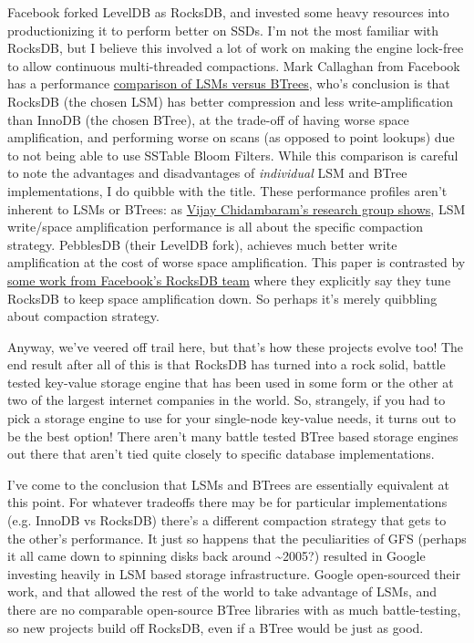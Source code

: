 \documentclass[a4paper,12pt,notitlepage,twoside,openright]{article}
\begin{document}
Facebook forked LevelDB as RocksDB, and invested some heavy resources
into productionizing it to perform better on SSDs. I'm not the most
familiar with RocksDB, but I believe this involved a lot of work on
making the engine lock-free to allow continuous multi-threaded
compactions. Mark Callaghan from Facebook has a performance
\href{http://smalldatum.blogspot.com/2016/01/summary-of-advantages-of-lsm-vs-b-tree.html}{comparison
of LSMs versus BTrees}, who's conclusion is that RocksDB (the chosen
LSM) has better compression and less write-amplification than InnoDB
(the chosen BTree), at the trade-off of having worse space
amplification, and performing worse on scans (as opposed to point
lookups) due to not being able to use SSTable Bloom Filters. While this
comparison is careful to note the advantages and disadvantages of
\emph{individual} LSM and BTree implementations, I do quibble with the
title. These performance profiles aren't inherent to LSMs or BTrees: as
\href{http://www.cs.utexas.edu/\%7Evijay/papers/sosp17-pebblesdb.pdf}{Vijay
Chidambaram's research group shows}, LSM write/space amplification
performance is all about the specific compaction strategy. PebblesDB
(their LevelDB fork), achieves much better write amplification at the
cost of worse space amplification. This paper is contrasted by
\href{http://cidrdb.org/cidr2017/papers/p82-dong-cidr17.pdf}{some work
from Facebook's RocksDB team} where they explicitly say they tune
RocksDB to keep space amplification down. So perhaps it's merely
quibbling about compaction strategy.

Anyway, we've veered off trail here, but that's how these projects
evolve too! The end result after all of this is that RocksDB has turned
into a rock solid, battle tested key-value storage engine that has been
used in some form or the other at two of the largest internet companies
in the world. So, strangely, if you had to pick a storage engine to use
for your single-node key-value needs, it turns out to be the best
option! There aren't many battle tested BTree based storage engines out
there that aren't tied quite closely to specific database
implementations.

I've come to the conclusion that LSMs and BTrees are essentially
equivalent at this point. For whatever tradeoffs there may be for
particular implementations (e.g. InnoDB vs RocksDB) there's a different
compaction strategy that gets to the other's performance. It just so
happens that the peculiarities of GFS (perhaps it all came down to
spinning disks back around \textasciitilde{}2005?) resulted in Google
investing heavily in LSM based storage infrastructure. Google
open-sourced their work, and that allowed the rest of the world to take
advantage of LSMs, and there are no comparable open-source BTree
libraries with as much battle-testing, so new projects build off
RocksDB, even if a BTree would be just as good.
\end{document}
